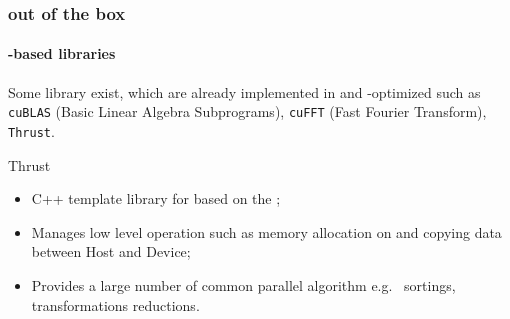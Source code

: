
	\begin{frame}%
		\frametitle{\cuda{} out of the box}
			\framesubtitle{\cuda{}-based libraries}
		Some library exist, which are already implemented in \cuda{} and \gpu-optimized such as \lstinline!cuBLAS! (Basic Linear Algebra Subprograms), \lstinline!cuFFT! (Fast Fourier Transform), \lstinline!Thrust!.

		\begin{block}{Thrust}
			\begin{itemize}
				\item C++ template library for \cuda{} based on the \stl{};%
				\item Manages low level operation such as memory allocation on \gpu{} and copying data between Host and Device;
				\item Provides a large number of common parallel algorithm e.g.~ sortings, transformations reductions.%
			\end{itemize}
		\end{block}
	\end{frame}
